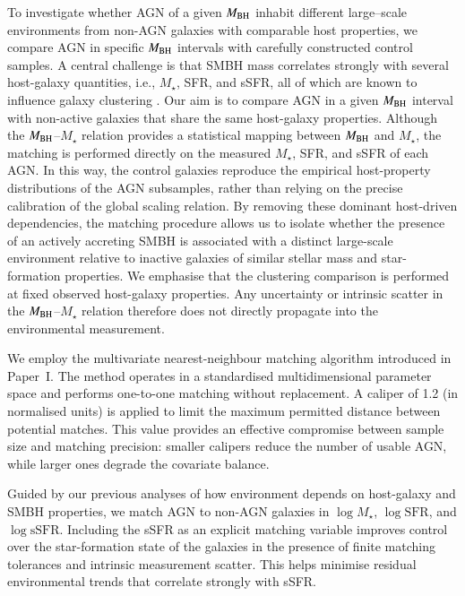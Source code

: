 \documentclass{aa}
\begin{document}
To investigate whether AGN of a given $M_{\rm BH}$ inhabit different large--scale environments from non-AGN galaxies with comparable host properties, we compare AGN in specific $M_{\rm BH}$ intervals with carefully constructed control samples. A central challenge is that SMBH mass correlates strongly with several host-galaxy quantities, i.e., $M_\star$, SFR, and sSFR, all of which are known to influence galaxy clustering  
\citep[e.g.][]{Mountrichas2019, Allevato2019}.  
Our aim is to compare AGN in a given $M_{\rm BH}$ interval with non-active galaxies that share the same host-galaxy properties. Although the $M_{\rm BH}$--$M_\star$ relation provides a statistical mapping between $M_{\rm BH}$ and $M_\star$, the matching is performed directly on the measured $M_\star$, SFR, and sSFR of each AGN. In this way, the control galaxies reproduce the empirical host-property distributions of the AGN subsamples, rather than relying on the precise calibration of the global scaling relation.
By removing these dominant host-driven dependencies, the matching procedure allows us to isolate whether the presence of an actively accreting SMBH is associated with a distinct large-scale environment relative to inactive galaxies of similar stellar mass and star-formation properties. We emphasise that the clustering comparison is performed at fixed observed host-galaxy properties. Any uncertainty or intrinsic scatter in the $M_{\rm BH}$--$M_\star$ relation therefore does not directly propagate into the environmental measurement.

We employ the multivariate nearest-neighbour matching algorithm introduced in Paper~I.  
The method operates in a standardised multidimensional parameter space and performs one-to-one matching without replacement.  
A caliper of 1.2 (in normalised units) is applied to limit the maximum permitted distance between potential matches.  
This value provides an effective compromise between sample size and matching precision: smaller calipers reduce the number of usable AGN, while larger ones degrade the covariate balance.

Guided by our previous analyses of how environment depends on host-galaxy and SMBH properties, we match AGN to non-AGN galaxies in $\log M_\star$, $\log \mathrm{SFR}$, and $\log \mathrm{sSFR}$. Including the sSFR as an explicit matching variable improves control over the star-formation state of the galaxies in the presence of finite matching tolerances and intrinsic measurement scatter. This helps minimise residual environmental trends that correlate strongly with sSFR.
\end{document}

